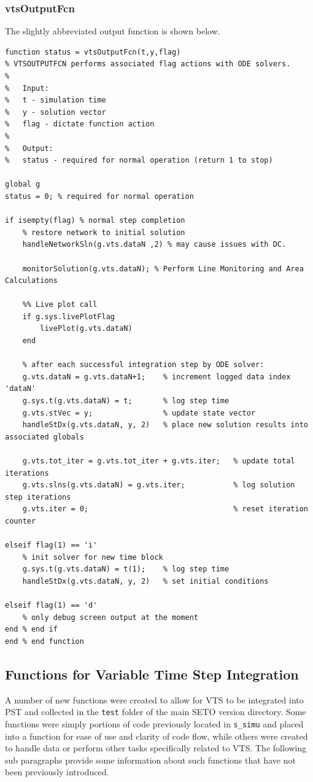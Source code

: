 \subsubsection{vtsOutputFcn} 
The slightly abbreviated output function is shown below.
\begin{verbatim}
function status = vtsOutputFcn(t,y,flag)
% VTSOUTPUTFCN performs associated flag actions with ODE solvers.
%
%   Input:
%   t - simulation time
%   y - solution vector
%   flag - dictate function action
%
%   Output:
%   status - required for normal operation (return 1 to stop)

global g 
status = 0; % required for normal operation

if isempty(flag) % normal step completion
    % restore network to initial solution
    handleNetworkSln(g.vts.dataN ,2) % may cause issues with DC.
    
    monitorSolution(g.vts.dataN); % Perform Line Monitoring and Area Calculations 
    
    %% Live plot call
    if g.sys.livePlotFlag
        livePlot(g.vts.dataN)
    end
    
    % after each successful integration step by ODE solver:
    g.vts.dataN = g.vts.dataN+1;    % increment logged data index 'dataN'
    g.sys.t(g.vts.dataN) = t;       % log step time
    g.vts.stVec = y;                % update state vector
    handleStDx(g.vts.dataN, y, 2)   % place new solution results into associated globals
    
    g.vts.tot_iter = g.vts.tot_iter + g.vts.iter;   % update total iterations
    g.vts.slns(g.vts.dataN) = g.vts.iter;           % log solution step iterations
    g.vts.iter = 0;                                 % reset iteration counter
    
elseif flag(1) == 'i' 
    % init solver for new time block
    g.sys.t(g.vts.dataN) = t(1);    % log step time
    handleStDx(g.vts.dataN, y, 2)   % set initial conditions
  
elseif flag(1) == 'd'
    % only debug screen output at the moment
end % end if
end % end function
\end{verbatim}

\subsection{Functions for Variable Time Step Integration}  
A number of new functions were created to allow for VTS to be integrated into PST and collected in the \verb|test| folder of the main SETO version directory.
Some functions were simply portions of code previously located in \verb|s_simu| and placed into a function for ease of use and clarity of code flow, while others were created to handle data or perform other tasks specifically related to VTS.
The following sub paragraphs provide some information about such functions that have not been previously introduced.

